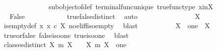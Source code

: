 \begin{isabellebody}
\ \ \ \ \ \ \ \ \ \ \ \ \ \ subobject{\isacharunderscore}{\kern0pt}of{\isacharunderscore}{\kern0pt}def{}\ terminal{\isacharunderscore}{\kern0pt}func{\isacharunderscore}{\kern0pt}unique\ true{\isacharunderscore}{\kern0pt}func{\isacharunderscore}{\kern0pt}type\ x{\isacharunderscore}{\kern0pt}in{\isacharunderscore}{\kern0pt}X{\isacharparenright}{\kern0pt}\isanewline
\ \ \ \ \ \ \ \ \isamarkupfalse%
\ \isamarkupfalse%
\ False\isanewline
\ \ \ \ \ \ \ \ \ \ \isamarkupfalse%
\ true{\isacharunderscore}{\kern0pt}false{\isacharunderscore}{\kern0pt}distinct\ \isamarkupfalse%
\ auto\isanewline
\ \ \ \ \ \ \isamarkupfalse%
\isanewline
\ \ \ \ \ \ \isamarkupfalse%
\ \isamarkupfalse%
\ {\isachardoublequoteopen}X\ {\isasymcong}\ {\isasymemptyset}{\isachardoublequoteclose}\isanewline
\ \ \ \ \ \ \ \ \isamarkupfalse%
\ is{\isacharunderscore}{\kern0pt}empty{\isacharunderscore}{\kern0pt}def\ {\isacartoucheopen}{\isasymnexists}x{\isachardot}{\kern0pt}\ x\ {\isasymin}\isactrlsub c\ X{\isacartoucheclose}\ no{\isacharunderscore}{\kern0pt}el{\isacharunderscore}{\kern0pt}iff{\isacharunderscore}{\kern0pt}iso{\isacharunderscore}{\kern0pt}empty\ \isamarkupfalse%
\ blast\isanewline
\ \ \ \ \isamarkupfalse%
\isanewline
\isanewline
\ \ \ \ \isamarkupfalse%
\ {\isachardoublequoteopen}X\ {\isasymcong}\ one\ {\isasymor}\ X\ {\isasymcong}\ {\isasymemptyset}{\isachardoublequoteclose}\isanewline
\ \ \ \ \ \ \isamarkupfalse%
\ {\isasymchi}{\isacharunderscore}{\kern0pt}true{\isacharunderscore}{\kern0pt}or{\isacharunderscore}{\kern0pt}false\ false{\isacharunderscore}{\kern0pt}iso{\isacharunderscore}{\kern0pt}one\ true{\isacharunderscore}{\kern0pt}iso{\isacharunderscore}{\kern0pt}one\ \isamarkupfalse%
\ blast\isanewline
\ \ \isamarkupfalse%
\isanewline
\isanewline
\ \ \isamarkupfalse%
\ classes{\isacharunderscore}{\kern0pt}distinct{\isacharcolon}{\kern0pt}\ {\isachardoublequoteopen}{\isacharbraceleft}{\kern0pt}{\isacharparenleft}{\kern0pt}X{\isacharcomma}{\kern0pt}\ m{\isacharparenright}{\kern0pt}{\isachardot}{\kern0pt}\ X\ {\isasymcong}\ {\isasymemptyset}{\isacharbraceright}{\kern0pt}\ {\isasymnoteq}\ {\isacharbraceleft}{\kern0pt}{\isacharparenleft}{\kern0pt}X{\isacharcomma}{\kern0pt}\ m{\isacharparenright}{\kern0pt}{\isachardot}{\kern0pt}\ X\ {\isasymcong}\ one{\isacharbraceright}{\kern0pt}{\isachardoublequoteclose}\isanewline
\ \ \ \ \isamarkupfalse%

\end{isabellebody}
